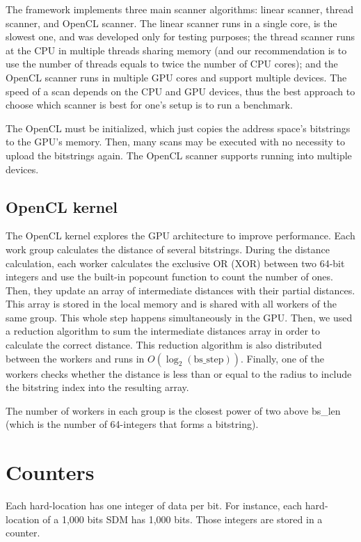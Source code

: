 The framework implements three main scanner algorithms: linear scanner, thread scanner, and OpenCL scanner. The linear scanner runs in a single core, is the slowest one, and was developed only for testing purposes; the thread scanner runs at the CPU in multiple threads sharing memory (and our recommendation is to use the number of threads equals to twice the number of CPU cores); and the OpenCL scanner runs in multiple GPU cores and support multiple devices. The speed of a scan depends on the CPU and GPU devices, thus the best approach to choose which scanner is best for one's setup is to run a benchmark.

The OpenCL must be initialized, which just copies the address space's bitstrings to the GPU's memory. Then, many scans may be executed with no necessity to upload the bitstrings again. The OpenCL scanner supports running into multiple devices.

\subsection{OpenCL kernel}

The OpenCL kernel explores the GPU architecture to improve performance. Each work group calculates the distance of several bitstrings. During the distance calculation, each worker calculates the exclusive OR (XOR) between two 64-bit integers and use the built-in popcount function to count the number of ones. Then, they update an array of intermediate distances with their partial distances. This array is stored in the local memory and is shared with all workers of the same group. This whole step happens simultaneously in the GPU. Then, we used a reduction algorithm to sum the intermediate distances array in order to calculate the correct distance. This reduction algorithm is also distributed between the workers and runs in $O(\log_2(\text{bs\_step}))$. Finally, one of the workers checks whether the distance is less than or equal to the radius to include the bitstring index into the resulting array.

The number of workers in each group is the closest power of two above bs\_len (which is the number of 64-integers that forms a bitstring).


\section{Counters}

Each hard-location has one integer of data per bit. For instance, each hard-location of a 1,000 bits SDM has 1,000 bits. Those integers are stored in a counter.

